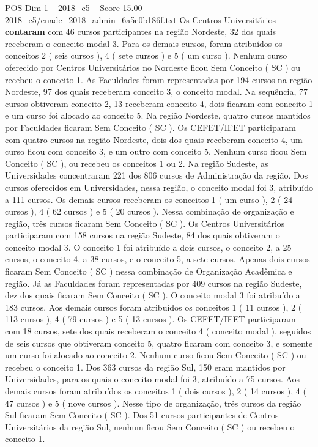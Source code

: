 \begin{textsample}{POS Dim 1 – 2018\_c5 – Score 15.00 – 2018\_c5/enade\_2018\_admin\_6a5e0b186f.txt}
Os Centros Universitários \textbf{contaram} com 46 cursos participantes na região Nordeste, 32 dos quais receberam o conceito modal 3.
Para os demais cursos, foram atribuídos os conceitos 2 ( seis cursos ), 4 ( sete cursos ) e 5 ( um curso ).
Nenhum curso oferecido por Centros Universitários no Nordeste ficou Sem Conceito ( SC ) ou recebeu o conceito 1.
As Faculdades foram representadas por 194 cursos na região Nordeste, 97 dos quais receberam conceito 3, o conceito modal.
Na sequência, 77 cursos obtiveram conceito 2, 13 receberam conceito 4, dois ficaram com conceito 1 e um curso foi alocado ao conceito 5.
Na região Nordeste, quatro cursos mantidos por Faculdades ficaram Sem Conceito ( SC ).
Os CEFET/IFET participaram com quatro cursos na região Nordeste, dois dos quais receberam conceito 4, um curso ficou com conceito 3, e um outro com conceito 5.
Nenhum curso ficou Sem Conceito ( SC ), ou recebeu os conceitos 1 ou 2.
Na região Sudeste, as Universidades concentraram 221 dos 806 cursos de Administração da região.
Dos cursos oferecidos em Universidades, nessa região, o conceito modal foi 3, atribuído a 111 cursos.
Os demais cursos receberam os conceitos 1 ( um curso ), 2 ( 24 cursos ), 4 ( 62 cursos ) e 5 ( 20 cursos ).
Nessa combinação de organização e região, três cursos ficaram Sem Conceito ( SC ).
Os Centros Universitários participaram com 158 cursos na região Sudeste, 84 dos quais obtiveram o conceito modal 3.
O conceito 1 foi atribuído a dois cursos, o conceito 2, a 25 cursos, o conceito 4, a 38 cursos, e o conceito 5, a sete cursos.
Apenas dois cursos ficaram Sem Conceito ( SC ) nessa combinação de Organização Acadêmica e região.
Já as Faculdades foram representadas por 409 cursos na região Sudeste, dez dos quais ficaram Sem Conceito ( SC ).
O conceito modal 3 foi atribuído a 183 cursos.
Aos demais cursos foram atribuídos os conceitos 1 ( 11 cursos ), 2 ( 113 cursos ), 4 ( 79 cursos ) e 5 ( 13 cursos ).
Os CEFET/IFET participaram com 18 cursos, sete dos quais receberam o conceito 4 ( conceito modal ), seguidos de seis cursos que obtiveram conceito 5, quatro ficaram com conceito 3, e somente um curso foi alocado ao conceito 2.
Nenhum curso ficou Sem Conceito ( SC ) ou recebeu o conceito 1.
Dos 363 cursos da região Sul, 150 eram mantidos por Universidades, para os quais o conceito modal foi 3, atribuído a 75 cursos.
Aos demais cursos foram atribuídos os conceitos 1 ( dois cursos ), 2 ( 14 cursos ), 4 ( 47 cursos ) e 5 ( nove cursos ).
Nesse tipo de organização, três cursos da região Sul ficaram Sem Conceito ( SC ).
Dos 51 cursos participantes de Centros Universitários da região Sul, nenhum ficou Sem Conceito ( SC ) ou recebeu o conceito 1.

\end{textsample}

